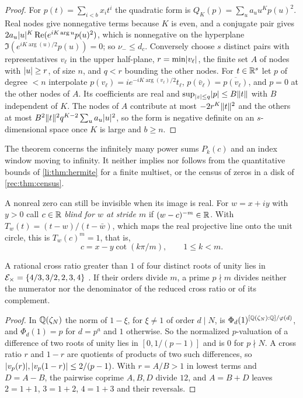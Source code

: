 \begin{proof}
For $p(t)=\sum_{i<b}x_it^i$ the quadratic form is $Q_K(p)=\sum_ua_uu^Kp(u)^2$. Real nodes give
nonnegative terms because $K$ is even, and a conjugate pair gives
$2a_u\lvert u\rvert^K\operatorname{Re}(e^{iK\arg u}p(u)^2)$, which is nonnegative on the hyperplane
$\Im(e^{iK\arg(u)/2}p(u))=0$; so $\nu_-\le d_c$. Conversely choose $s$ distinct pairs with
representatives $v_\ell$ in the upper half-plane, $r=\min\lvert v_\ell\rvert$, the finite set $A$ of
nodes with $\lvert u\rvert\ge r$, of size $n$, and $q<r$ bounding the other nodes. For $t\in\mathbb{R}^s$ let
$p$ of degree $<n$ interpolate $p(v_\ell)=ie^{-iK\arg(v_\ell)/2}t_\ell$,
$p(\bar v_\ell)=\overline{p(v_\ell)}$, and $p=0$ at the other nodes of $A$. Its coefficients
are real and $\sup_{\lvert z\rvert\le q}\lvert p\rvert\le B\lVert t\rVert$ with $B$ independent of $K$. The nodes of $A$
contribute at most $-2r^K\lVert t\rVert^2$ and the others at most
$B^2\lVert t\rVert^2q^{K-2}\sum_ua_u\lvert u\rvert^2$, so the form is negative definite on an $s$-dimensional
space once $K$ is large and $b\ge n$.
\end{proof}

The theorem concerns the infinitely many power sums $P_k(c)$ and an index window moving to
infinity. It neither implies nor follows from the quantitative bounds of \cref{li:thm:hermite}
for a finite multiset, or the census of zeros in a disk of \cref{rec:thm:census}.

A nonreal zero can still be invisible when its image is real. For $w=x+iy$ with $y>0$ call
$c\in\mathbb{R}$ \emph{blind for $w$ at stride $m$} if $(w-c)^{-m}\in\mathbb{R}$. With
$T_w(t)=(t-w)/(t-\bar w)$, which maps the real projective line onto the unit circle, this is
$T_w(c)^m=1$, that is,
\begin{equation}\label{ana:eq:cot}
 c=x-y\cot(k\pi/m),\qquad1\le k<m .
\end{equation}

\begin{lemma}\label{ana:lem:cyclo}
A rational cross ratio greater than $1$ of four distinct roots of unity lies in
$\mathcal{E}_\times=\{4/3,3/2,2,3,4\}$ \cite[Theorem~3.10]{GardnerGritzmann1997Discrete}. If their
orders divide $m$, a prime $p\nmid m$ divides neither the numerator nor the denominator of the
reduced cross ratio or of its complement.
\end{lemma}

\begin{proof}
In $\mathbb{Q}(\zeta_N)$ the norm of $1-\xi$, for $\xi\ne1$ of order $d\mid N$, is
$\Phi_d(1)^{[\mathbb{Q}(\zeta_N):\mathbb{Q}]/\varphi(d)}$, and $\Phi_d(1)=p$ for $d=p^a$ and $1$ otherwise. So the
normalized $p$-valuation of a difference of two roots of unity lies in $[0,1/(p-1)]$ and is $0$
for $p\nmid N$. A cross ratio $r$ and $1-r$ are quotients of products of two such differences,
so $\lvert v_p(r)\rvert,\lvert v_p(1-r)\rvert\le2/(p-1)$. With $r=A/B>1$ in lowest terms and $D=A-B$, the
pairwise coprime $A,B,D$ divide $12$, and $A=B+D$ leaves $2=1+1$, $3=1+2$, $4=1+3$ and
their reversals.
\end{proof}

